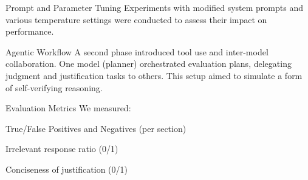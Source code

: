    Prompt and Parameter Tuning
    Experiments with modified system prompts and various temperature settings were conducted to assess their impact on performance.

    Agentic Workflow
    A second phase introduced tool use and inter-model collaboration. One model (planner) orchestrated evaluation plans, delegating judgment and justification tasks to others. This setup aimed to simulate a form of self-verifying reasoning.

    Evaluation Metrics
    We measured:

        True/False Positives and Negatives (per section)

        Irrelevant response ratio (0/1)

        Conciseness of justification (0/1)
